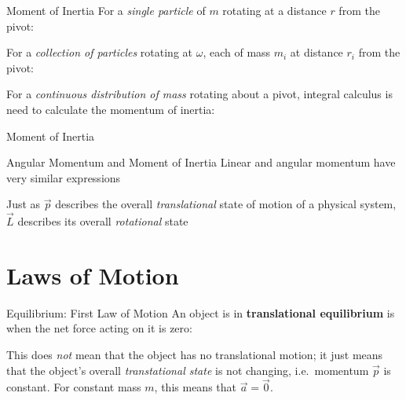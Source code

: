 \documentclass[12pt,compress,aspectratio=169]{beamer}
\begin{document}
\begin{frame}{Moment of Inertia}
  For a \emph{single particle} of $m$ rotating at a distance $r$ from the pivot:
  

  For a \emph{collection of particles} rotating at $\omega$, each of mass
  $m_i$ at distance $r_i$ from the pivot:


  For a \emph{continuous distribution of mass} rotating about a pivot, integral
  calculus is need to calculate the momentum of inertia:

\end{frame}



\begin{frame}{Moment of Inertia}
  \centering
\end{frame}



\begin{frame}{Angular Momentum and Moment of Inertia}
  Linear and angular momentum have very similar expressions
    
  \vspace{-.3in}{\large
    \begin{align*}
      \vec p &= m\vec v\\
      \vec L &= I\vec\omega
    \end{align*}
  }
  
  Just as $\vec p$ describes the overall \emph{translational} state of motion
  of a physical system, $\vec L$ describes its overall \emph{rotational} state
\end{frame}



\section{Laws of Motion}

\begin{frame}{Equilibrium: First Law of Motion}
  An object is in \textbf{translational equilibrium} is when the net force
  acting on it is zero:
  

  This does \emph{not} mean that the object has no translational motion; it
  just means that the object's overall \emph{transtational state} is not
  changing, i.e.\ momentum $\vec p$ is constant. For constant mass $m$,
  this means that $\vec a=\vec 0$.
\end{frame}
\end{document}
